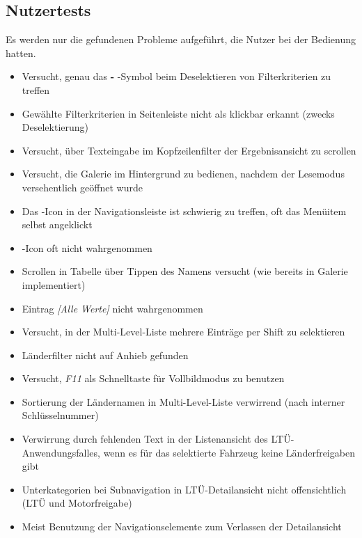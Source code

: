 \subsection{Nutzertests} \label{sec:resultUser}
Es werden nur die gefundenen Probleme aufgeführt, die Nutzer bei der Bedienung hatten.
\begin{itemize}
 \item Versucht, genau das \textbf{-} -Symbol beim Deselektieren von Filterkriterien zu treffen
 \item Gewählte Filterkriterien in Seitenleiste nicht als klickbar erkannt (zwecks Deselektierung)
 \item Versucht, über Texteingabe im Kopfzeilenfilter der Ergebnisansicht zu scrollen
\end{itemize}
\begin{itemize}
 \item Versucht, die Galerie im Hintergrund zu bedienen, nachdem der Lesemodus versehentlich geöffnet wurde
 \item Das -Icon in der Navigationsleiste ist schwierig zu treffen, oft das Menüitem selbst angeklickt
 \item {}-Icon oft nicht wahrgenommen
 \item Scrollen in Tabelle über Tippen des Namens versucht (wie bereits in Galerie implementiert)
\end{itemize}
\begin{itemize}
 \item Eintrag \textit{[Alle Werte]} nicht wahrgenommen
 \item Versucht, in der Multi-Level-Liste mehrere Einträge per Shift zu selektieren
\end{itemize}
\begin{itemize}
 \item Länderfilter nicht auf Anhieb gefunden
 \item Versucht, \textit{F11} als Schnelltaste für Vollbildmodus zu benutzen
 \item Sortierung der Ländernamen in Multi-Level-Liste verwirrend (nach interner Schlüsselnummer)
 \item Verwirrung durch fehlenden Text in der Listenansicht des LTÜ-Anwendungsfalles, wenn es für das selektierte Fahrzeug keine Länderfreigaben gibt
 \item Unterkategorien bei Subnavigation in LTÜ-Detailansicht nicht offensichtlich (LTÜ und Motorfreigabe)
 \item Meist Benutzung der Navigationselemente zum Verlassen der Detailansicht
\end{itemize}
